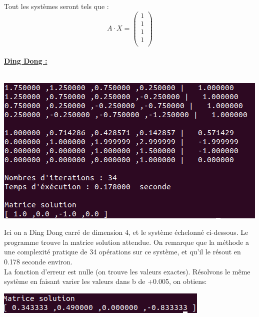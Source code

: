 \documentclass[a4paper]{article}
\begin{document}
Tout les systèmes seront tels que :\\
\[
A \cdot X = 
\begin{pmatrix} 
1  \\ 
1  \\ 
1  \\ 
1  \\
\end{pmatrix}
\]
\\
\textbf{\underline{\large{Ding Dong :}}}
\\
\\
\begin{center}
	\includegraphics[scale=0.5]{./img/gauss/TestDingDong.png} \\
\end{center}

Ici on a Ding Dong carré de dimension 4, et le système échelonné ci-dessous.
Le programme trouve la matrice solution attendue.
On remarque que la méthode a une complexité pratique de 34 opérations sur ce système, et qu'il le résout en 0.178 seconde environ.
\\
La fonction d'erreur est nulle (on trouve les valeurs exactes).
Résolvons le même système en faisant varier les valeurs dans b de +0.005, on obtiens:
\\
\begin{center}
	\includegraphics[scale=0.5]{./img/gauss/dingdong005.png} \\
\end{center}
\end{document}

